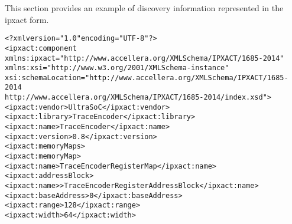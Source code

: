 This section provides an example of discovery information represented in
the ipxact form.

\begin{alltt}
<?xml version="1.0" encoding="UTF-8"?>
<ipxact:component 
   xmlns:ipxact="http://www.accellera.org/XMLSchema/IPXACT/1685-2014"
   xmlns:xsi="http://www.w3.org/2001/XMLSchema-instance" 
   xsi:schemaLocation="http://www.accellera.org/XMLSchema/IPXACT/1685-2014 
                       http://www.accellera.org/XMLSchema/IPXACT/1685-2014/index.xsd">
   <ipxact:vendor>UltraSoC</ipxact:vendor>
   <ipxact:library>TraceEncoder</ipxact:library>
   <ipxact:name>TraceEncoder</ipxact:name>
   <ipxact:version>0.8</ipxact:version>
   <ipxact:memoryMaps>
      <ipxact:memoryMap>
         <ipxact:name>Trace Encoder Register Map</ipxact:name>
         <ipxact:addressBlock>
            <ipxact:name>>Trace Encoder Register Address Block</ipxact:name>
            <ipxact:baseAddress>0</ipxact:baseAddress>
            <ipxact:range>128</ipxact:range>
            <ipxact:width>64</ipxact:width>


\end{alltt}

